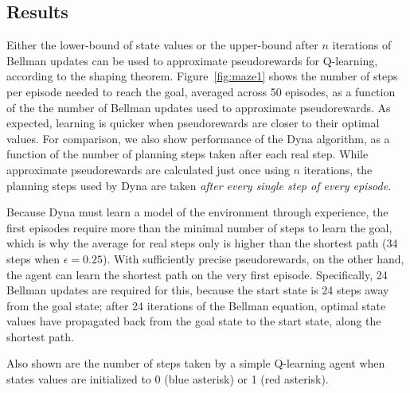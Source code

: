 \documentclass[letterpaper]{article}
\begin{document}
\subsection{Results}

Either the lower-bound of state values or the upper-bound after $n$ iterations of Bellman updates can be used to approximate pseudorewards for Q-learning, according to the shaping theorem. Figure~\ref{fig:maze1} shows the number of steps per episode needed to reach the goal, averaged across 50 episodes, as a function of the the number of Bellman updates used to approximate pseudorewards.
As expected, learning is quicker when pseudorewards are closer to their optimal values. For comparison, we also show performance of the Dyna algorithm, as a function of the number of planning steps taken after each real step.
While approximate pseudorewards are calculated just once using $n$ iterations, the planning steps used by Dyna are taken \textit{after every single step of every episode}.

Because Dyna must learn a model of the environment through experience, the first episodes require more than the minimal number of steps to learn the goal, which is why the average for real steps only is higher than the shortest path (34 steps when $\epsilon=0.25$). With sufficiently precise pseudorewards, on the other hand, the agent can learn the shortest path on the very first episode. Specifically, 24 Bellman updates are required for this, because the start state is 24 steps away from the goal state; after 24 iterations of the Bellman equation, optimal state values have propagated back from the goal state to the start state, along the shortest path.

Also shown are the number of steps taken by a simple Q-learning agent when states values are initialized to 0 (blue asterisk) or 1 (red asterisk).
\end{document}
